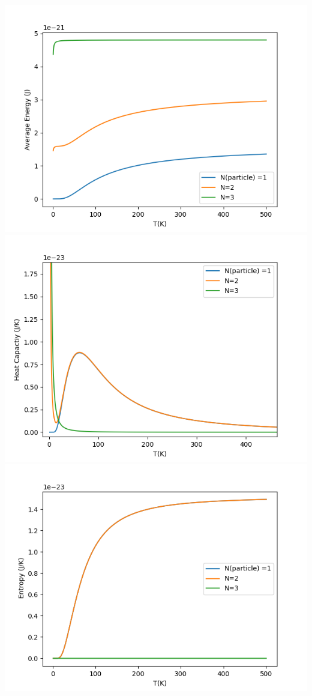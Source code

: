 \documentclass{article}
\begin{document}
	\inputminted{python}{prac_3_FD.py}
	\includegraphics[width=15 cm]{FD_1.png}
	\includegraphics[width=15 cm]{FD_2.png}
	\includegraphics[width=15 cm]{FD_3.png}
\end{document}
